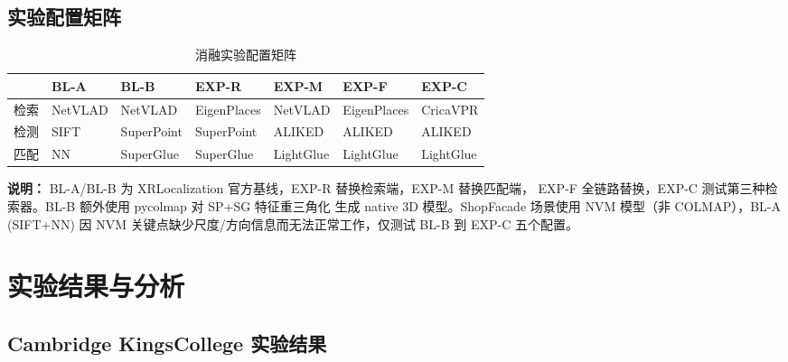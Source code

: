 \documentclass[12pt,a4paper]{ctexart}
\begin{document}
\subsection{实验配置矩阵}

\begin{table}[H]
\centering
\caption{消融实验配置矩阵}
\label{tab:configs}
\small
\begin{tabularx}{\textwidth}{@{}lXXXXXX@{}}
\toprule
& \textbf{BL-A} & \textbf{BL-B} & \textbf{EXP-R} & \textbf{EXP-M} & \textbf{EXP-F} & \textbf{EXP-C} \\
\midrule
检索 & NetVLAD & NetVLAD & EigenPlaces & NetVLAD & EigenPlaces & CricaVPR \\
检测 & SIFT & SuperPoint & SuperPoint & ALIKED & ALIKED & ALIKED \\
匹配 & NN & SuperGlue & SuperGlue & LightGlue & LightGlue & LightGlue \\
\bottomrule
\end{tabularx}
\end{table}

\noindent
\textbf{说明：} BL-A/BL-B 为 XRLocalization 官方基线，EXP-R 替换检索端，EXP-M 替换匹配端，
EXP-F 全链路替换，EXP-C 测试第三种检索器。BL-B 额外使用 pycolmap 对 SP+SG 特征重三角化
生成 native 3D 模型。ShopFacade 场景使用 NVM 模型（非 COLMAP），BL-A (SIFT+NN) 因
NVM 关键点缺少尺度/方向信息而无法正常工作，仅测试 BL-B 到 EXP-C 五个配置。

\section{实验结果与分析}

\subsection{Cambridge KingsCollege 实验结果}
\end{document}
